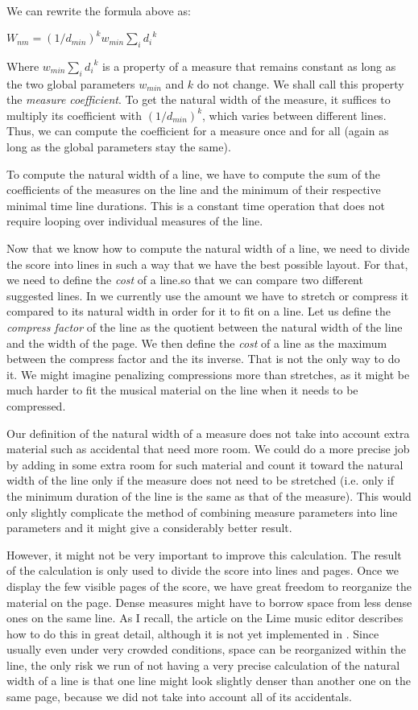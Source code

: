 We can rewrite the formula above as:

$W_{nm} = {(1 / d_{min})}^k w_{min}  \sum_i {d_i}^k$

Where $w_{min}  \sum_i {d_i}^k$ is a property of a measure that
remains constant as long as the two global parameters $w_{min}$ and
$k$ do not change.  We shall call this property the \emph{measure
coefficient}.  To get the natural width of the measure, it suffices to
multiply its coefficient with ${(1 / d_{min})}^k$, which varies
between different lines.  Thus, we can compute the coefficient for a
measure once and for all (again as long as the global parameters stay
the same). 

To compute the natural width of a line, we have to compute the sum of
the coefficients of the measures on the line and the minimum of their
respective minimal time line durations.  This is a constant time
operation that does not require looping over individual measures of
the line.  

Now that we know how to compute the natural width of a line, we need
to divide the score into lines in such a way that we have the best
possible layout.  For that, we need to define the \emph{cost} of a
line.so that we can compare two different suggested lines.  In \sysname{}
we currently use the amount we have to stretch or compress it compared
to its natural width in order for it to fit on a line.  Let us define
the \emph{compress factor} of the line as the quotient between the
natural width of the line and the width of the page.  We then define
the \emph{cost} of a line as the maximum between the compress factor
and the its inverse.  That is not the only way to do it.  We might
imagine penalizing compressions more than stretches, as it might be
much harder to fit the musical material on the line when it needs to
be compressed. 

Our definition of the natural width of a measure does not take into
account extra material such as accidental that need more room.  We
could do a more precise job by adding in some extra room for such
material and count it toward the natural width of the line only if the
measure does not need to be stretched (i.e. only if the minimum
duration of the line is the same as that of the measure).  This would
only slightly complicate the method of combining measure parameters
into line parameters and it might give a considerably better result. 

However, it might not be very important to improve this calculation.
The result of the calculation is only used to divide the score into
lines and pages.  Once we display the few visible pages of the score,
we have great freedom to reorganize the material on the page.  Dense
measures might have to borrow space from less dense ones on the same
line.  As I recall, the article on the Lime music editor describes how
to do this in great detail, although it is not yet implemented in
\sysname{}.  Since usually even under very crowded conditions, space can be
reorganized within the line, the only risk we run of not having a very
precise calculation of the natural width of a line is that one line
might look slightly denser than another one on the same page, because
we did not take into account all of its accidentals. 

